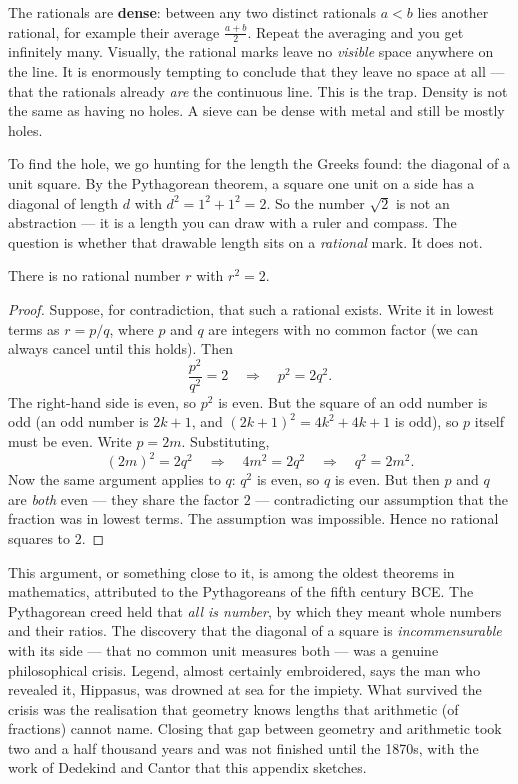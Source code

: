 \begin{intuitionbox}
The rationals are \textbf{dense}: between any two distinct rationals $a<b$ lies another
rational, for example their average $\frac{a+b}{2}$. Repeat the averaging and you get
infinitely many. Visually, the rational marks leave no \emph{visible} space anywhere on
the line. It is enormously tempting to conclude that they leave no space at all --- that
the rationals already \emph{are} the continuous line. This is the trap. Density is not
the same as having no holes. A sieve can be dense with metal and still be mostly holes.
\end{intuitionbox}

To find the hole, we go hunting for the length the Greeks found: the diagonal of a unit
square. By the Pythagorean theorem, a square one unit on a side has a diagonal of length
$d$ with $d^2 = 1^2 + 1^2 = 2$. So the number $\sqrt{2}$ is not an abstraction --- it is a
length you can draw with a ruler and compass. The question is whether that drawable length
sits on a \emph{rational} mark. It does not.

\begin{theorem}
\label{ch41:sqrt2-irrational}
There is no rational number $r$ with $r^2 = 2$.
\end{theorem}

\begin{proof}
Suppose, for contradiction, that such a rational exists. Write it in lowest terms as
$r = p/q$, where $p$ and $q$ are integers with no common factor (we can always cancel until
this holds). Then
\[
  \frac{p^2}{q^2} = 2 \quad\Longrightarrow\quad p^2 = 2q^2.
\]
The right-hand side is even, so $p^2$ is even. But the square of an odd number is odd
(an odd number is $2k+1$, and $(2k+1)^2 = 4k^2+4k+1$ is odd), so $p$ itself must be even.
Write $p = 2m$. Substituting,
\[
  (2m)^2 = 2q^2 \quad\Longrightarrow\quad 4m^2 = 2q^2 \quad\Longrightarrow\quad q^2 = 2m^2.
\]
Now the same argument applies to $q$: $q^2$ is even, so $q$ is even. But then $p$ and $q$
are \emph{both} even --- they share the factor $2$ --- contradicting our assumption that
the fraction was in lowest terms. The assumption was impossible. Hence no rational squares
to $2$.
\end{proof}

\begin{historybox}
This argument, or something close to it, is among the oldest theorems in mathematics,
attributed to the Pythagoreans of the fifth century BCE. The Pythagorean creed held that
\emph{all is number}, by which they meant whole numbers and their ratios. The discovery
that the diagonal of a square is \emph{incommensurable} with its side --- that no common
unit measures both --- was a genuine philosophical crisis. Legend, almost certainly
embroidered, says the man who revealed it, Hippasus, was drowned at sea for the impiety.
What survived the crisis was the realisation that geometry knows lengths that arithmetic
(of fractions) cannot name. Closing that gap between geometry and arithmetic took two and
a half thousand years and was not finished until the 1870s, with the work of Dedekind and
Cantor that this appendix sketches.
\end{historybox}

